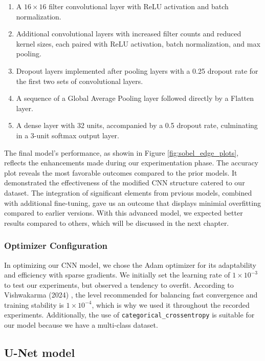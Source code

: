 \begin{enumerate}
  \item A $16 \times 16$ filter convolutional layer with ReLU activation and batch normalization.
  \item Additional convolutional layers with increased filter counts and reduced kernel sizes, each paired with ReLU activation, batch normalization, and max pooling.
  \item Dropout layers implemented after pooling layers with a 0.25 dropout rate for the first two sets of convolutional layers.
  \item A sequence of a Global Average Pooling layer followed directly by a Flatten layer.
  \item A dense layer with 32 units, accompanied by a 0.5 dropout rate, culminating in a 3-unit softmax output layer.
\end{enumerate}

The final model's performance, as showin in Figure \ref{fig:sobel_edge_plots}, reflects the enhancements made during our experimentation phase. The accuracy plot reveals the most favorable outcomes compared to the prior models. It demonstrated the effectiveness of the modified CNN structure catered to our dataset. The integration of significant elements from prvious models, combined with additional fine-tuning, gave us an outcome that displays minimial overfitting compared to earlier versions. With this advanced model, we expected better results compared to others, which will be discussed in the next chapter. 

\subsubsection{Optimizer Configuration}

In optimizing our CNN model, we chose the Adam optimizer for its adaptability and efficiency with sparse gradients. We initially set the learning rate of $1 \times 10^{-3}$ to test our experiments, but observed a tendency to overfit. According to Vishwakarma (2024) \cite{adam_optimizer}, the level recommended for balancing fast convergence and training stability is \(1 \times 10^{-4}\), which is why we used it throughout the recorded experiments. Additionally, the use of \texttt{categorical\_crossentropy} is suitable for our model because we have a multi-class dataset.

\subsection{U-Net model}

